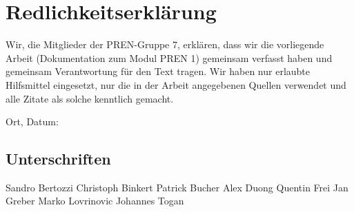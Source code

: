 \documentclass[a4paper,12pt]{scrartcl}
\begin{document}
\setlength{\parindent}{0pt}

\section*{Redlichkeitserklärung}

Wir, die Mitglieder der PREN-Gruppe 7, erklären, dass  wir die vorliegende Arbeit (Dokumentation zum Modul PREN 1) gemeinsam verfasst haben und  gemeinsam Verantwortung für den Text tragen. Wir haben nur erlaubte Hilfsmittel eingesetzt, nur die in der Arbeit angegebenen Quellen verwendet und alle Zitate als solche kenntlich gemacht.

\vskip 14pt

Ort, Datum:

\vskip 14pt

\dotfill

\subsection*{Unterschriften}

\begin{multicols}{2}
\vskip 14pt
Sandro Bertozzi
\vskip 14pt
\dotfill
\vskip 14pt
Christoph Binkert
\vskip 14pt
\dotfill
\vskip 14pt
Patrick Bucher
\vskip 14pt
\dotfill
\vskip 14pt
Alex Duong
\vskip 14pt
\dotfill
\vskip 14pt
\columnbreak
Quentin Frei
\vskip 14pt
\dotfill
\vskip 14pt
Jan Greber
\vskip 14pt
\dotfill
\vskip 14pt
Marko Lovrinovic
\vskip 14pt
\dotfill
\vskip 14pt
Johannes Togan
\vskip 14pt
\dotfill
\end{multicols}
\end{document}
